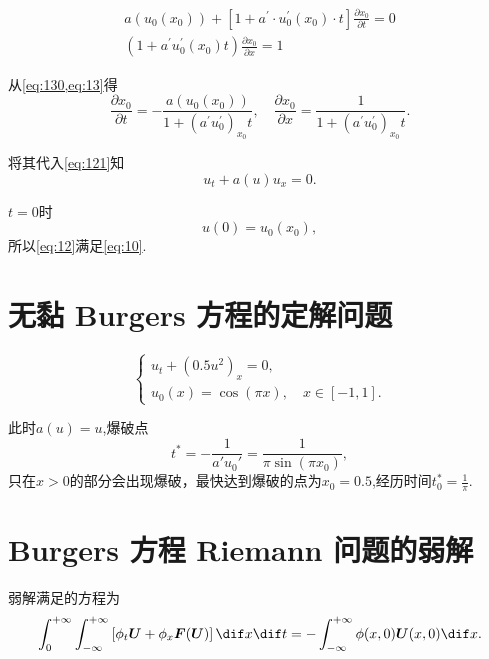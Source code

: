 \documentclass[12pt]{article}
\begin{document}
\begin{gather}
a\left(u_{0}\left(x_{0}\right)\right)+\left[1+a^{\prime} \cdot u_{0}^{\prime}\left(x_{0}\right) \cdot t\right] \frac{\partial x_{0}}{\partial t}=0 
\label{eq:130}
\\
\left(1+a^{\prime} u_{0}^{\prime}\left(x_{0}\right) t\right) \frac{\partial x_{0}}{\partial x}=1
\label{eq:13}
\end{gather}

从\cref{eq:130,eq:13}得
\begin{equation}
	\frac{\partial x_{0}}{\partial t}=-\frac{a\left(u_{0}\left(x_{0}\right)\right)}{1+\left(a^{\prime} u_{0}^{\prime}\right)_{x_{0}} t}, \quad \frac{\partial x_{0}}{\partial x}=\frac{1}{1+\left(a^{\prime} u_{0}^{\prime}\right)_{x_{0}} t}.
\end{equation}

将其代入\cref{eq:121}知
\begin{equation}
	u_{t}+a(u) u_{x}=0.
\end{equation}

$t=0$时
\begin{equation}
	u(0)=u_{0}\left(x_{0}\right),
\end{equation}
所以\cref{eq:12}满足\cref{eq:10}.

\section{无黏 Burgers 方程的定解问题}

\begin{equation}
	\begin{cases}
		u_t+(0.5 u^2)_x=0, \\
		u_0(x) = \cos(\pi x),\quad x \in [-1,1].
	\end{cases}
\end{equation}


此时$a(u)=u$,爆破点
\begin{equation}
	t^* = - \frac{1}{a'u_0'} = \frac{1}{\pi \sin(\pi x_0)},
\end{equation}
只在$x>0$的部分会出现爆破，最快达到爆破的点为$x_0=0.5$,经历时间$t_0^*=\frac{1}{\pi}$.


\section{Burgers 方程 Riemann 问题的弱解}

弱解满足的方程为
\begin{equation}
	\int_{0}^{+\infty} \int_{-\infty}^{+\infty}\left[\phi_{t} \boldsymbol{U}+\phi_{x} \boldsymbol{F}(\boldsymbol{U})\right] \dif x \dif t=-\int_{-\infty}^{+\infty} \phi(x, 0) \boldsymbol{U}(x, 0) \dif x.
\end{equation}
\end{document}
